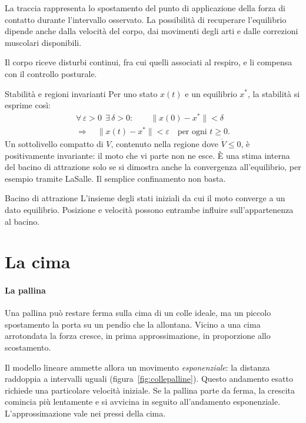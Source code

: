 \documentclass[11pt]{article}
\begin{document}
La traccia rappresenta lo spostamento del punto di applicazione della forza di contatto durante l'intervallo osservato. La possibilità di recuperare l'equilibrio dipende anche dalla velocità del corpo, dai movimenti degli arti e dalle correzioni muscolari disponibili.

Il corpo riceve disturbi continui, fra cui quelli associati al respiro, e li compensa con il controllo posturale.

\begin{formule}{Stabilità e regioni invarianti}
Per uno stato $x(t)$ e un equilibrio $x^\ast$, la stabilità si esprime così:
\[
\begin{gathered}
\forall\,\varepsilon>0\ \ \exists\,\delta>0:\qquad
\lVert x(0)-x^\ast\rVert<\delta \\
\Longrightarrow\quad \lVert x(t)-x^\ast\rVert<\varepsilon
\quad \text{per ogni } t\ge 0 .
\end{gathered}
\]
Un sottolivello compatto di $V$, contenuto nella regione dove $\dot V\le0$, è positivamente invariante: il moto che vi parte non ne esce. È una stima interna del bacino di attrazione solo se si dimostra anche la convergenza all'equilibrio, per esempio tramite LaSalle. Il semplice confinamento non basta.
\end{formule}

\begin{parola}{Bacino di attrazione}
L'insieme degli stati iniziali da cui il moto converge a un dato equilibrio. Posizione e velocità possono entrambe influire sull'appartenenza al bacino.
\end{parola}

\section{La cima}\label{sec:cima}

\paragraph{La pallina} Una pallina può restare ferma sulla cima di un colle ideale, ma un piccolo spostamento la porta su un pendio che la allontana. Vicino a una cima arrotondata la forza cresce, in prima approssimazione, in proporzione allo scostamento.

Il modello lineare ammette allora un movimento \emph{esponenziale}: la distanza raddoppia a intervalli uguali (figura~\ref{fig:collepalline}). Questo andamento esatto richiede una particolare velocità iniziale. Se la pallina parte da ferma, la crescita comincia più lentamente e si avvicina in seguito all'andamento esponenziale. L'approssimazione vale nei pressi della cima.
\end{document}
